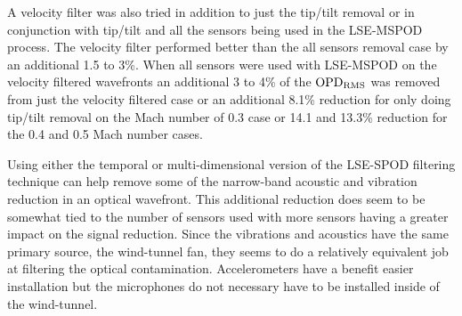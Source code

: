 A velocity filter was also tried in addition to just the tip/tilt removal or in conjunction with tip/tilt and all the sensors being used in the LSE-MSPOD process.
The velocity filter performed better than the all sensors removal case by an additional 1.5 to 3\%.
When all sensors were used with LSE-MSPOD on the velocity filtered wavefronts an additional 3 to 4\% of the $\operatorname{OPD_{RMS}}$ was removed from just the velocity filtered case or an additional 8.1\% reduction for only doing tip/tilt removal on the Mach number of 0.3 case or 14.1 and 13.3\% reduction for the 0.4 and 0.5 Mach number cases.

Using either the temporal or multi-dimensional version of the LSE-SPOD filtering technique can help remove some of the narrow-band acoustic and vibration reduction in an optical wavefront.
This additional reduction does seem to be somewhat tied to the number of sensors used with more sensors having a greater impact on the signal reduction.
Since the vibrations and acoustics have the same primary source, the wind-tunnel fan, they seems to do a relatively equivalent job at filtering the optical contamination.
Accelerometers have a benefit easier installation but the microphones do not necessary have to be installed inside of the wind-tunnel.
